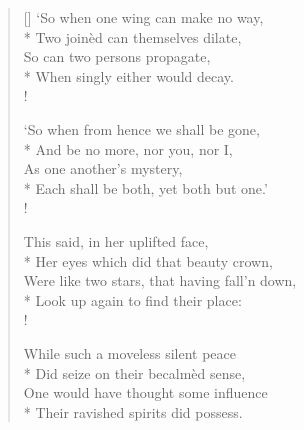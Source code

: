 \documentclass[MAIN]{subfiles}
\begin{document}
\begin{verse}[\versewidth]
`So when one wing can make no way,\\*
\vin Two join\`ed can themselves dilate,\\
\vin So can two persons propagate,\\*
When singly either would decay.\\!

`So when from hence we shall be gone,\\*
\vin And be no more, nor you, nor I,\\
\vin As one another's mystery,\\*
Each shall be both, yet both but one.'\\!

This said, in her uplifted face,\\*
\vin Her eyes which did that beauty crown,\\
\vin Were like two stars, that having fall'n down,\\*
Look up again to find their place:\\!

While such a moveless silent peace\\*
\vin Did seize on their becalm\`ed sense,\\
\vin One would have thought some influence\\*
Their ravished spirits did possess.
\end{verse}
\end{document}
